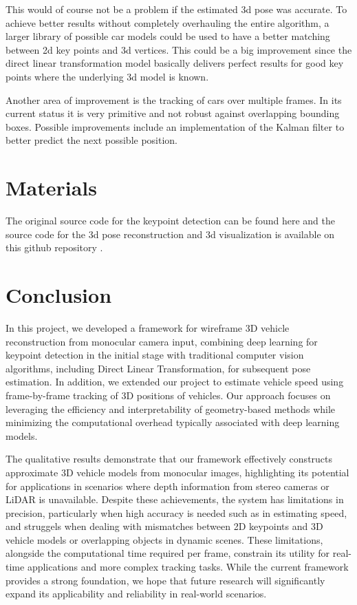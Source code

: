 \documentclass[conference]{IEEEtran}
\begin{document}
This would of course not be a problem if the estimated 3d pose was accurate. To achieve better results without completely overhauling the entire algorithm, a larger library of possible car models could be used to have a better matching between 2d key points and 3d vertices. This could be a big improvement since the direct linear transformation model basically delivers perfect results for good key points where the underlying 3d model is known.

Another area of improvement is the tracking of cars over multiple frames. In its current status it is very primitive and not robust against overlapping bounding boxes. Possible improvements include an implementation of the Kalman filter to better predict the next possible position.

\section{Materials}

The original source code for the keypoint detection can be found here \cite{keypoints} and the source code for the 3d pose reconstruction and 3d visualization is available on this github repository \cite{keypoint2pose}.

\section{Conclusion}

In this project, we developed a framework for wireframe 3D vehicle reconstruction from monocular camera input, combining deep learning for keypoint detection in the initial stage with traditional computer vision algorithms, including Direct Linear Transformation, for subsequent pose estimation. In addition, we extended our project to estimate vehicle speed using frame-by-frame tracking of 3D positions of vehicles. Our approach focuses on leveraging the efficiency and interpretability of geometry-based methods while minimizing the computational overhead typically associated with deep learning models.

The qualitative results demonstrate that our framework effectively constructs approximate 3D vehicle models from monocular images, highlighting its potential for applications in scenarios where depth information from stereo cameras or LiDAR is unavailable. Despite these achievements, the system has limitations in precision, particularly when high accuracy is needed such as in estimating speed, and struggels when dealing with mismatches between 2D keypoints and 3D vehicle models or overlapping objects in dynamic scenes. These limitations, alongside the computational time required per frame, constrain its utility for real-time applications and more complex tracking tasks. While the current framework provides a strong foundation, we hope that future research will significantly expand its applicability and reliability in real-world scenarios.



\end{document}
